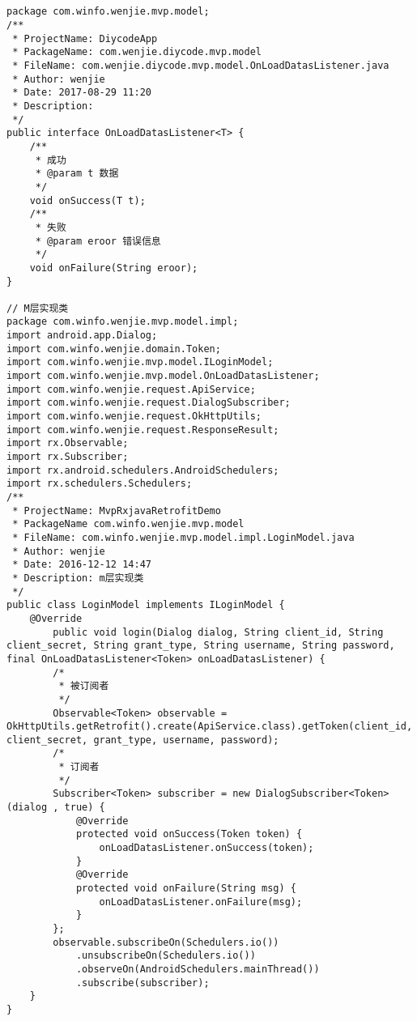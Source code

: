 \documentclass[9pt, b5paper]{article}
\begin{document}
\subsection{}
\label{sec-21-8}

\subsection{}
\label{sec-21-9}
\subsection{}
\label{sec-21-10}
\begin{verbatim}
package com.winfo.wenjie.mvp.model;
/**
 * ProjectName: DiycodeApp
 * PackageName: com.wenjie.diycode.mvp.model
 * FileName: com.wenjie.diycode.mvp.model.OnLoadDatasListener.java
 * Author: wenjie
 * Date: 2017-08-29 11:20
 * Description:
 */
public interface OnLoadDatasListener<T> {
    /**
     * 成功
     * @param t 数据
     */
    void onSuccess(T t);
    /**
     * 失败
     * @param eroor 错误信息
     */
    void onFailure(String eroor);
}

// M层实现类
package com.winfo.wenjie.mvp.model.impl;
import android.app.Dialog;
import com.winfo.wenjie.domain.Token;
import com.winfo.wenjie.mvp.model.ILoginModel;
import com.winfo.wenjie.mvp.model.OnLoadDatasListener;
import com.winfo.wenjie.request.ApiService;
import com.winfo.wenjie.request.DialogSubscriber;
import com.winfo.wenjie.request.OkHttpUtils;
import com.winfo.wenjie.request.ResponseResult;
import rx.Observable;
import rx.Subscriber;
import rx.android.schedulers.AndroidSchedulers;
import rx.schedulers.Schedulers;
/**
 * ProjectName: MvpRxjavaRetrofitDemo
 * PackageName com.winfo.wenjie.mvp.model
 * FileName: com.winfo.wenjie.mvp.model.impl.LoginModel.java
 * Author: wenjie
 * Date: 2016-12-12 14:47
 * Description: m层实现类
 */
public class LoginModel implements ILoginModel {
    @Override
        public void login(Dialog dialog, String client_id, String client_secret, String grant_type, String username, String password, final OnLoadDatasListener<Token> onLoadDatasListener) {
        /*
         * 被订阅者
         */
        Observable<Token> observable = OkHttpUtils.getRetrofit().create(ApiService.class).getToken(client_id, client_secret, grant_type, username, password);
        /*
         * 订阅者
         */
        Subscriber<Token> subscriber = new DialogSubscriber<Token>(dialog , true) {
            @Override
            protected void onSuccess(Token token) {
                onLoadDatasListener.onSuccess(token);
            }
            @Override
            protected void onFailure(String msg) {
                onLoadDatasListener.onFailure(msg);
            }
        };
        observable.subscribeOn(Schedulers.io())
            .unsubscribeOn(Schedulers.io())
            .observeOn(AndroidSchedulers.mainThread())
            .subscribe(subscriber);
    }
}


\end{verbatim}
\end{document}
